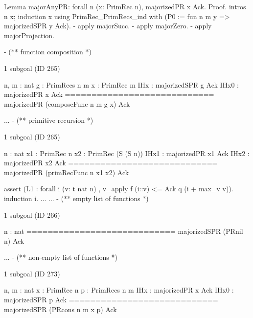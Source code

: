 
\begin{Coqsrc}
Lemma majorAnyPR:  forall n (x: PrimRec n),  majorizedPR  x Ack.
Proof.
  intros n x; induction x using PrimRec_PrimRecs_ind with
                  (P0 := fun n m y => majorizedSPR  y Ack).
  - apply majorSucc.
  - apply majorZero.
  - apply majorProjection. 
  \end{Coqsrc}

  \begin{Coqsrc}
  - (** function composition *)
\end{Coqsrc}
\begin{Coqanswer}
1 subgoal (ID 265)

  n, m : nat
  g : PrimRecs n m
  x : PrimRec m
  IHx : majorizedSPR g Ack
  IHx0 : majorizedPR x Ack
  ============================
  majorizedPR (composeFunc n m g x) Ack
\end{Coqanswer}

\begin{Coqsrc}
  ...
 - (** primitive recursion *)
\end{Coqsrc}

\begin{Coqanswer}
1 subgoal (ID 265)
  
  n : nat
  x1 : PrimRec n
  x2 : PrimRec (S (S n))
  IHx1 : majorizedPR x1 Ack
  IHx2 : majorizedPR x2 Ack
  ============================
  majorizedPR (primRecFunc n x1 x2) Ack
\end{Coqanswer}

\begin{Coqsrc}
 assert (L1 : forall i (v: t nat n) ,
               v_apply f (i::v)  <= Ack q (i + max_v v)).
    { induction i.
      ...
    }
    ...
-  (** empty list of functions *)
\end{Coqsrc}

\begin{Coqanswer}
1 subgoal (ID 266)
  
  n : nat
  ============================
  majorizedSPR (PRnil n) Ack
\end{Coqanswer}

\begin{Coqsrc}
  ...
- (** non-empty list of functions *)
\end{Coqsrc}

\begin{Coqanswer}
1 subgoal (ID 273)
  
  n, m : nat
  x : PrimRec n
  p : PrimRecs n m
  IHx : majorizedPR x Ack
  IHx0 : majorizedSPR p Ack
  ============================
  majorizedSPR (PRcons n m x p) Ack
\end{Coqanswer}
  
